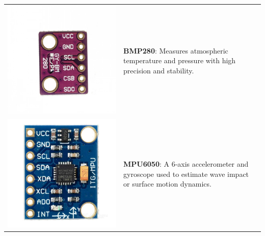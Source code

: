 \documentclass{article}
\begin{document}
\begin{tabular}{@{}m{} m{}@{}}
    \includegraphics[width=0.9\linewidth, angle=90]{assets/bmp280.jpg} &
    \textbf{BMP280}: Measures atmospheric temperature and pressure with high precision and stability. \\
    
    \includegraphics[width=0.7\linewidth]{assets/mpu6050.jpeg} &
    \textbf{MPU6050}: A 6-axis accelerometer and gyroscope used to estimate wave impact or surface motion dynamics. \\
    

\end{tabular}
\end{document}
